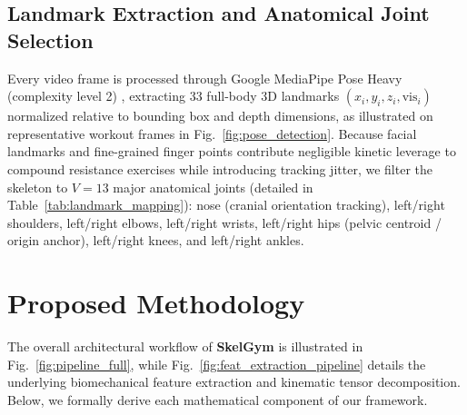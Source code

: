 \documentclass[runningheads]{llncs}
\begin{document}
\subsection{Landmark Extraction and Anatomical Joint Selection}
Every video frame is processed through Google MediaPipe Pose Heavy (complexity level 2) \cite{chuankun2019,bazarevsky2020}, extracting 33 full-body 3D landmarks $(x_i, y_i, z_i, \text{vis}_i)$ normalized relative to bounding box and depth dimensions, as illustrated on representative workout frames in Fig.~\ref{fig:pose_detection}. Because facial landmarks and fine-grained finger points contribute negligible kinetic leverage to compound resistance exercises while introducing tracking jitter, we filter the skeleton to $V=13$ major anatomical joints (detailed in Table~\ref{tab:landmark_mapping}): nose (cranial orientation tracking), left/right shoulders, left/right elbows, left/right wrists, left/right hips (pelvic centroid / origin anchor), left/right knees, and left/right ankles.

\section{Proposed Methodology}
\label{sec:methodology}

The overall architectural workflow of \textbf{SkelGym} is illustrated in Fig.~\ref{fig:pipeline_full}, while Fig.~\ref{fig:feat_extraction_pipeline} details the underlying biomechanical feature extraction and kinematic tensor decomposition. Below, we formally derive each mathematical component of our framework.
\end{document}
